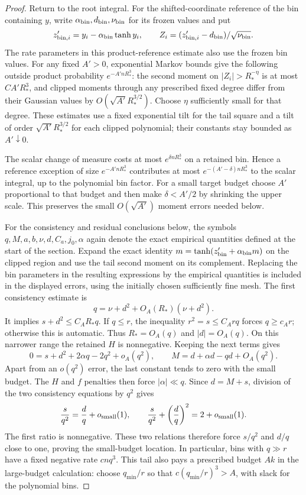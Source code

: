 \begin{proof}
Return to the root integral. For the shifted-coordinate reference of
the bin containing $y$, write $\alpha_{\rm bin},d_{\rm bin},\nu_{\rm bin}$
for its frozen values and put
\[
 z'_{{\rm bin},i}=y_i-\alpha_{\rm bin}\tanh y_i,\qquad
 Z_i=(z'_{{\rm bin},i}-d_{\rm bin})/\sqrt{\nu_{\rm bin}}.
\]
The rate parameters in this product-reference estimate also use the
frozen bin values. For any fixed $A'>0$, exponential Markov
bounds give the following outside product probability
$e^{-A'nR_*^3}$: the second moment on $|Z_i|>R_*^{-\eta}$ is at most
$C A'R_*^3$, and clipped moments through any prescribed fixed degree
differ from their Gaussian values by $O(\sqrt{A'}R_*^{3/2})$.
Choose $\eta$ sufficiently small for that degree. These estimates use
a fixed exponential tilt for the tail square and a tilt of order
$\sqrt{A'}R_*^{3/2}$ for each clipped polynomial; their constants stay
bounded as $A'\downarrow0$.

The scalar change of measure costs at most $e^{\delta nR_*^3}$ on a
retained bin. Hence a reference exception of size $e^{-A'nR_*^3}$
contributes at most $e^{-(A'-\delta)nR_*^3}$ to the scalar integral,
up to the polynomial bin factor. For a small target budget choose
$A'$ proportional to that budget and then make $\delta<A'/2$ by
shrinking the upper scale. This preserves the small
$O(\sqrt{A'})$ moment errors needed below.

For the consistency and residual conclusions below, the symbols
$q,M,a,b,\nu,d,C_a,j_0,\alpha$ again denote the exact empirical quantities
defined at the start of the section. Expand the exact identity
$m=\tanh(z'_{\rm bin}+\alpha_{\rm bin}m)$ on the clipped region and use
the tail second moment on its complement. Replacing the bin parameters
in the resulting expressions by the empirical quantities is included
in the displayed errors, using the initially chosen sufficiently fine
mesh. The first consistency estimate is
\[
 q=\nu+d^2+O_A(R_*)(\nu+d^2).
\]
It implies $s+d^2\le C_AR_*q$. If $q\le r$, the inequality
$r^2=s\le C_Arq$ forces $q\ge c_Ar$; otherwise this is automatic.
Thus $R_*=O_A(q)$ and $|d|=O_A(q)$. On this narrower range the
retained $H$ is nonnegative. Keeping the next terms gives
\[
 0=s+d^2+2\alpha q-2q^2+o_A(q^2),\qquad
 M=d+\alpha d-qd+O_A(q^2).
\]
Apart from an $o(q^2)$ error, the last constant tends to zero with the
small budget. The $H$ and $f$ penalties then force $|\alpha|\ll q$.
Since $d=M+s$, division of the two consistency equations by $q^2$
gives
\[
 \frac{s}{q^2}=\frac dq+o_{\rm small}(1),\qquad
 \frac{s}{q^2}+\left(\frac dq\right)^2=2+o_{\rm small}(1).
\]
The first ratio is nonnegative. These two relations therefore force
$s/q^2$ and $d/q$ close to one, proving the small-budget location.
In particular, bins with $q\gg r$ have a fixed negative rate
$cnq^3$. This tail also pays a prescribed budget $Ak$ in the
large-budget calculation: choose $q_{\min}/r$ so that
$c(q_{\min}/r)^3>A$, with slack for the polynomial bins.


\end{proof}
